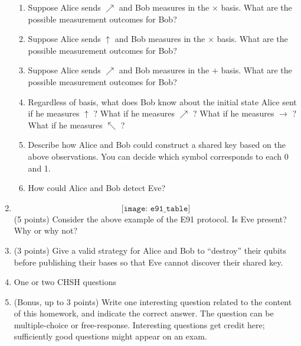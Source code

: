 \documentclass[12pt]{article}
\begin{document}
\begin{enumerate}[font=\bfseries]
\begin{enumerate}
            \item Suppose Alice sends $\nearrow$ and Bob measures in the $\times$ basis. What are the possible measurement outcomes for Bob?
            \item Suppose Alice sends $\uparrow$ and Bob measures in the $\times$ basis. What are the possible measurement outcomes for Bob?
            \item Suppose Alice sends $\nearrow$ and Bob measures in the $+$ basis. What are the possible measurement outcomes for Bob?
            \item Regardless of basis, what does Bob know about the initial state Alice sent if he measures $\uparrow$ ? What if he measures $\nearrow$ ? What if he measures  $\rightarrow$ ? What if he measures $\nwarrow$ ?
            \item Describe how Alice and Bob could construct a shared key based on the above observations. You can decide which symbol corresponds to each 0 and 1. 
            \item How could Alice and Bob detect Eve?
        \end{enumerate}
    \item \[\texttt{[image: e91\_table]}\]
    (5 points) Consider the above example of the E91 protocol. Is Eve present? Why or why not?
    \item (3 points) Give a valid strategy for Alice and Bob to ``destroy'' their qubits before publishing their bases so that Eve cannot discover their shared key. 
    \item One or two CHSH questions
    \item (Bonus, up to 3 points) Write one interesting question related to the content of this homework, and indicate the correct answer. The question can be multiple-choice or free-response.  Interesting questions get credit here;  sufficiently good questions might appear on an exam.
\end{enumerate}
\end{document}
